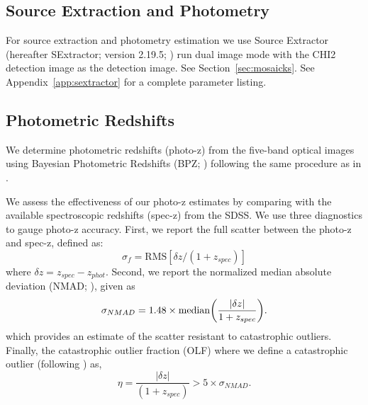 \documentclass[apj, revtex4]{emulateapj}
\begin{document}
\subsection{Source Extraction and Photometry}
For source extraction and photometry estimation we use Source Extractor (hereafter SExtractor; version 2.19.5; \citealt{Bertin1996}) run dual image mode with the CHI2 detection image as the detection image. See Section~\ref{sec:mosaicks}. See Appendix~\ref{app:sextractor} for a complete parameter listing.

\subsection{Photometric Redshifts}
We determine photometric redshifts (photo-z) from the five-band optical images using Bayesian Photometric Redshifts (BPZ; \citealt{Benitez2000, Coe2006}) following the same procedure as in \cite{Menanteau2009a}.

We assess the effectiveness of our photo-z estimates by comparing with the available spectroscopic redshifts (spec-z) from the SDSS. We use three diagnostics to gauge photo-z accuracy. First, we report the full scatter between the photo-z and spec-z, defined as:
\begin{equation}
	\sigma_f = \mathrm{RMS}[\delta z/(1+z_{spec})]
\end{equation}
where $\delta z = z_{spec} - z_{phot}$. Second, we report the normalized median absolute deviation (NMAD; \citealt{Ilbert2009, Dahlen2013, Molino2017}), given as
\begin{equation}
	\sigma_{NMAD} = 1.48 \times \mathrm{median} \bigg{(} \frac{|\delta z|}{1+z_{spec}} \bigg{)}.
\end{equation}   
which provides an estimate of the scatter resistant to catastrophic outliers. Finally, the catastrophic outlier fraction (OLF) where we define a catastrophic outlier (following \citealt{Molino2017}) as,
\begin{equation}
	\eta = \frac{|\delta z|}{(1+z_{spec})} > 5 \times \sigma_{NMAD}.
\end{equation}
\end{document}
